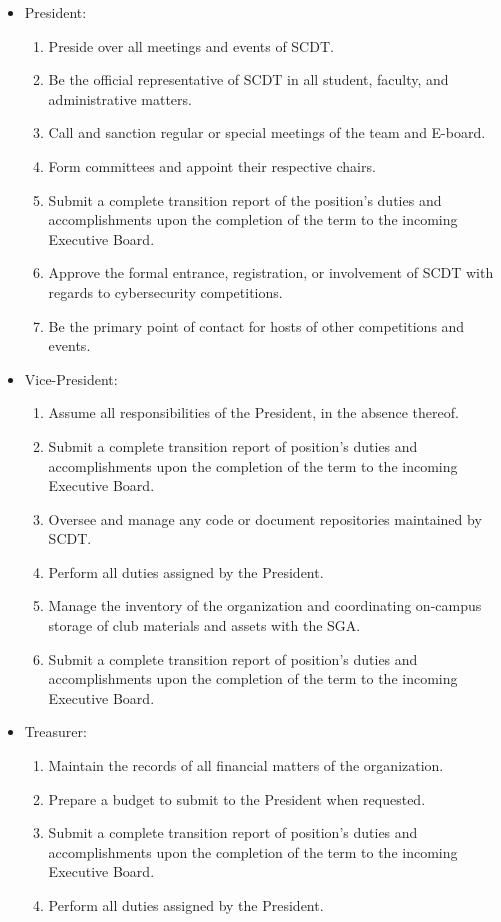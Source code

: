 \documentclass[12pt]{constitution}
\begin{document}
\begin{itemize}
\item President:
  \begin{enumerate}
  \item Preside over all meetings and events of SCDT.
  \item Be the official representative of SCDT in all student,
    faculty, and administrative matters. 
  \item Call and sanction regular or special meetings of the team and
    E-board.
  \item Form committees and appoint their respective chairs. 
  \item Submit a complete transition report of the position’s duties
    and accomplishments upon the completion of the term to the incoming
    Executive Board.
  \item Approve the formal entrance, registration, or involvement of
    SCDT with regards to cybersecurity competitions.
  \item Be the primary point of contact for hosts of other
    competitions and events.
  \end{enumerate}
  
\item Vice-President:
  \begin{enumerate}
  \item Assume all responsibilities of the President, in the absence
    thereof.
  \item Submit a complete transition report of position’s duties and
    accomplishments upon the completion of the term to the incoming
    Executive Board.
  \item Oversee and manage any code or document repositories
    maintained by SCDT.
  \item Perform all duties assigned by the President.
  \item Manage the inventory of the organization and coordinating
    on-campus storage of club materials and assets with the SGA.
  \item Submit a complete transition report of position’s duties and
    accomplishments upon the completion of the term to the incoming
    Executive Board.
  \end{enumerate}

\item Treasurer:
  \begin{enumerate}
  \item Maintain the records of all financial matters of the
    organization.
  \item Prepare a budget to submit to the President when requested.
  \item Submit a complete transition report of position’s duties and
    accomplishments upon the completion of the term to the incoming
    Executive Board.
  \item Perform all duties assigned by the President.
  \end{enumerate}


\end{itemize}
\end{document}
